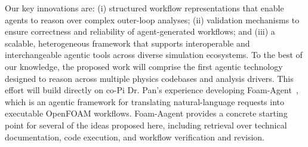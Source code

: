 \documentclass[11pt]{article} \usepackage[margin=1in]{geometry}
\begin{document}
Our key innovations are: (i) structured workflow representations that enable agents to reason over complex outer-loop analyses; (ii) validation mechanisms to ensure correctness and reliability of agent-generated workflows; and (iii) a scalable, heterogeneous framework that supports interoperable and interchangeable agentic tools across diverse simulation ecosystems. To the best of our knowledge, the proposed work will comprise the first agentic technology designed to reason across multiple physics codebases and analysis drivers. 
This effort will build directly on co-Pi Dr. Pan's experience developing
Foam-Agent~\cite{yue2026foamagentautomatedintelligentcfd}, which is an agentic framework for translating natural-language requests into
executable OpenFOAM workflows. Foam-Aagent provides a concrete starting point
for several of the ideas proposed here, including retrieval over technical
documentation, code execution, and workflow verification and revision. 
\end{document}
